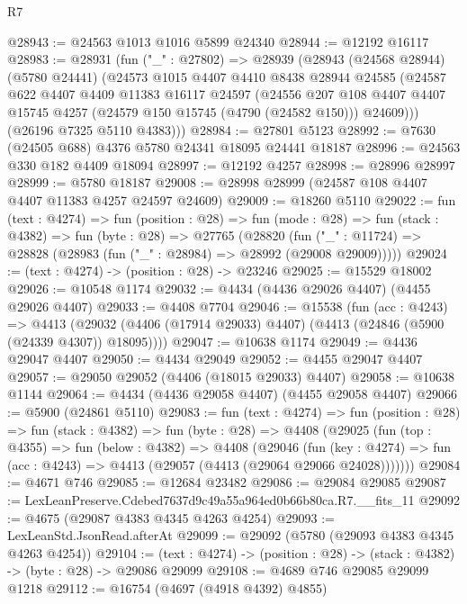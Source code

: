 \begin{lexlean}{R7}
\begin{coremodule}
@28943 := @24563 @1013 @1016 @5899 @24340
@28944 := @12192 @16117
@28983 := @28931
    (fun ("_" : @27802) =>
    @28939
      (@28943
        (@24568 @28944)
        (@5780 @24441)
        (@24573
          @1015
          @4407
          @4410
          @8438
          @28944
          @24585
          (@24587
            @622
            @4407
            @4409
            @11383
            @16117
            @24597
            (@24556
              @207
              @108
              @4407
              @4407
              @15745
              @4257
              (@24579 @150 @15745 (@4790 (@24582 @150)))
              @24609)))
        (@26196 @7325 @5110 @4383)))
@28984 := @27801 @5123
@28992 := @7630 (@24505 @688) @4376 @5780 @24341 @18095 @24441 @18187
@28996 := @24563 @330 @182 @4409 @18094
@28997 := @12192 @4257
@28998 := @28996 @28997
@28999 := @5780 @18187
@29008 := @28998 @28999 (@24587 @108 @4407 @4407 @11383 @4257 @24597 @24609)
@29009 := @18260 @5110
@29022 := fun (text : @4274) =>
  fun (position : @28) =>
  fun (mode : @28) =>
  fun (stack : @4382) =>
  fun (byte : @28) =>
  @27765
    (@28820 (fun ("_" : @11724) => @28828 (@28983 (fun ("_" : @28984) => @28992 (@29008 @29009)))))
@29024 := (text : @4274) -> (position : @28) -> @23246
@29025 := @15529 @18002
@29026 := @10548 @1174
@29032 := @4434 (@4436 @29026 @4407) (@4455 @29026 @4407)
@29033 := @4408 @7704
@29046 := @15538
    (fun (acc : @4243) =>
    @4413 (@29032 (@4406 (@17914 @29033) @4407) (@4413 (@24846 (@5900 (@24339 @4307)) @18095))))
@29047 := @10638 @1174
@29049 := @4436 @29047 @4407
@29050 := @4434 @29049
@29052 := @4455 @29047 @4407
@29057 := @29050 @29052 (@4406 (@18015 @29033) @4407)
@29058 := @10638 @1144
@29064 := @4434 (@4436 @29058 @4407) (@4455 @29058 @4407)
@29066 := @5900 (@24861 @5110)
@29083 := fun (text : @4274) =>
  fun (position : @28) =>
  fun (stack : @4382) =>
  fun (byte : @28) =>
  @4408
    (@29025
      (fun (top : @4355) =>
      fun (below : @4382) =>
      @4408
        (@29046
          (fun (key : @4274) =>
          fun (acc : @4243) => @4413 (@29057 (@4413 (@29064 @29066 @24028)))))))
@29084 := @4671 @746
@29085 := @12684 @23482
@29086 := @29084 @29085
@29087 := LexLeanPreserve.Cdebed7637d9c49a55a964ed0b66b80ca.R7.__fits_11
@29092 := @4675 (@29087 @4383 @4345 @4263 @4254)
@29093 := LexLeanStd.JsonRead.afterAt
@29099 := @29092 (@5780 (@29093 @4383 @4345 @4263 @4254))
@29104 := (text : @4274) -> (position : @28) -> (stack : @4382) -> (byte : @28) -> @29086 @29099
@29108 := @4689 @746 @29085 @29099 @1218
@29112 := @16754 (@4697 (@4918 @4392) @4855)

\end{coremodule}
\end{lexlean}
